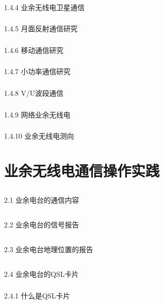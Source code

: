 \documentclass[12pt,UTF8]{ctexbook}
\begin{document}
\subsection{}1.4.4 业余无线电卫星通信
\subsection{}1.4.5 月面反射通信研究
\subsection{}1.4.6 移动通信研究
\subsection{}1.4.7 小功率通信研究
\subsection{}1.4.8 V/U波段通信
\subsection{}1.4.9 网络业余无线电
\subsection{}1.4.10 业余无线电测向

\chapter{业余无线电通信操作实践}

\section{}2.1 业余电台的通信内容
\section{}2.2 业余电台的信号报告
\section{}2.3 业余电台地理位置的报告
\section{}2.4 业余电台的QSL卡片
\subsection{}2.4.1 什么是QSL卡片
\end{document}
